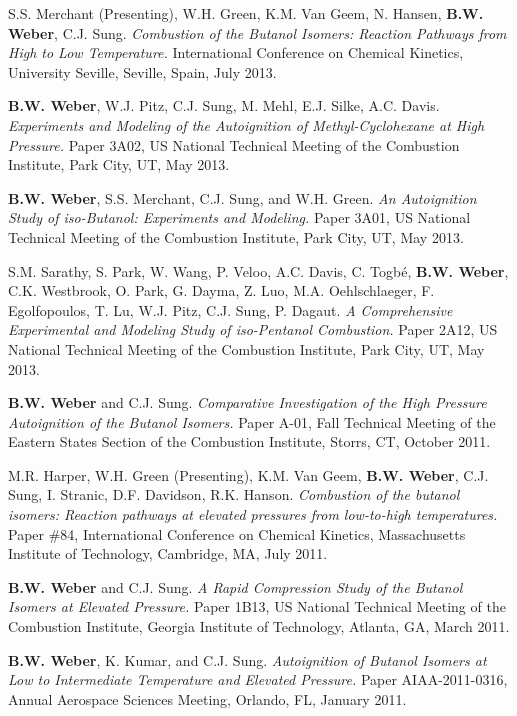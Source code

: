 \begin{bibsection}
\item[] S.S. Merchant (Presenting), W.H. Green, K.M. Van Geem, N. Hansen, \textbf{ B.W. Weber}, C.J. Sung. {\em Combustion of the Butanol Isomers: Reaction Pathways from High to Low Temperature.}  International Conference on Chemical Kinetics, University Seville, Seville, Spain, July 2013.

\item[] \textbf{ B.W. Weber}, W.J. Pitz, C.J. Sung, M. Mehl, E.J. Silke, A.C. Davis. \textit{Experiments and Modeling of the Autoignition of Methyl-Cyclohexane at High Pressure.} Paper 3A02,  US National Technical Meeting of the Combustion Institute, Park City, UT, May 2013.

\item[] \textbf{ B.W. Weber}, S.S. Merchant, C.J. Sung, and W.H. Green. \textit{An Autoignition Study of iso-Butanol: Experiments and Modeling.} Paper 3A01,  US National Technical Meeting of the Combustion Institute, Park City, UT, May 2013.

\item[] S.M. Sarathy, S. Park, W. Wang, P. Veloo, A.C. Davis, C. Togb\'{e}, \textbf{ B.W. Weber}, C.K. Westbrook, O. Park, G. Dayma, Z. Luo, M.A. Oehlschlaeger, F. Egolfopoulos, T. Lu, W.J. Pitz, C.J. Sung, P. Dagaut. \textit{A Comprehensive Experimental and Modeling Study of iso-Pentanol Combustion.} Paper 2A12,  US National Technical Meeting of the Combustion Institute, Park City, UT, May 2013.

\item[] \textbf{ B.W. Weber} and C.J. Sung. \textit{Comparative Investigation of the High Pressure Autoignition of the Butanol Isomers.} Paper A-01, Fall Technical Meeting of the Eastern States Section of the Combustion Institute, Storrs, CT, October 2011.

\item[] M.R. Harper, W.H. Green (Presenting), K.M. Van Geem, \textbf{ B.W. Weber}, C.J. Sung, I. Stranic, D.F. Davidson,  R.K. Hanson. \textit{Combustion of the butanol isomers: Reaction pathways at elevated pressures from low-to-high temperatures.} Paper \#84,  International Conference on Chemical Kinetics, Massachusetts Institute of Technology, Cambridge, MA, July 2011.

\item[] \textbf{ B.W. Weber} and C.J. Sung. \textit{A Rapid Compression Study of the Butanol Isomers at Elevated Pressure.} Paper 1B13,   US National Technical Meeting of the Combustion Institute, Georgia Institute of Technology, Atlanta, GA, March 2011.

\item[] \textbf{ B.W. Weber}, K. Kumar, and C.J. Sung. \textit{Autoignition of Butanol Isomers at Low to Intermediate Temperature and Elevated Pressure.} Paper AIAA-2011-0316,   Annual Aerospace Sciences Meeting, Orlando, FL, January 2011.
\end{bibsection}

